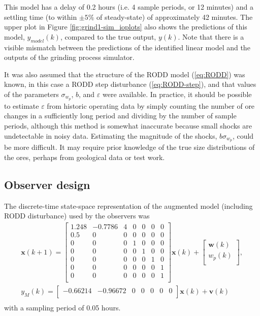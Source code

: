 This model has a delay of 0.2 hours (i.e. 4 sample periods, or 12 minutes) and a settling time (to within $\pm5\%$ of steady-state) of approximately 42 minutes. The upper plot in Figure \ref{fig:grind1-sim_ioplots} also shows the predictions of this model, $y_{model}(k)$, compared to the true output, $y(k)$. Note that there is a visible mismatch between the predictions of the identified linear model and the outputs of the grinding process simulator.

It was also assumed that the structure of the \gls{RODD} model (\ref{eq:RODD}) was known, in this case a \gls{RODD} step disturbance (\ref{eq:RODD-step}), and that values of the parameters $\sigma_{w_p}$, $b$, and $\varepsilon$ were available. In practice, it should be possible to estimate $\varepsilon$ from historic operating data by simply counting the number of ore changes in a sufficiently long period and dividing by the number of sample periods, although this method is somewhat inaccurate because small shocks are undetectable in noisy data. Estimating the magnitude of the shocks, $b\sigma_{w_p}$, could be more difficult. It may require prior knowledge of the true size distributions of the ores, perhaps from geological data or test work.

\subsection{Observer design} \label{sec:grind1-obs-design}

The discrete-time state-space representation of the augmented model (including \gls{RODD} disturbance) used by the observers was
\begin{multline} \label{eq:grind1-obs_ss_model}
	\mathbf{x}(k+1) = 
	\begin{bmatrix}
		1.248 & -0.7786 & 4 & 0 & 0 & 0 & 0 \\
		0.5   &  0      & 0 & 0 & 0 & 0 & 0 \\
		0     &  0      & 0 & 1 & 0 & 0 & 0 \\
		0     &  0      & 0 & 0 & 1 & 0 & 0 \\
		0     &  0      & 0 & 0 & 0 & 1 & 0 \\
		0     &  0      & 0 & 0 & 0 & 0 & 1 \\
		0     &  0      & 0 & 0 & 0 & 0 & 1 \\
	\end{bmatrix} \mathbf{x}(k)
	+ \begin{bmatrix}
		\mathbf{w}(k) \\
		w_p(k) \\
	\end{bmatrix}, \\
	y_M(k) = 
	\begin{bmatrix}
		-0.66214 & -0.96672 & 0 & 0 & 0 & 0 & 0 \\
	\end{bmatrix} \mathbf{x}(k) + \mathbf{v}(k) \\
\end{multline}
with a sampling period of 0.05 hours.

